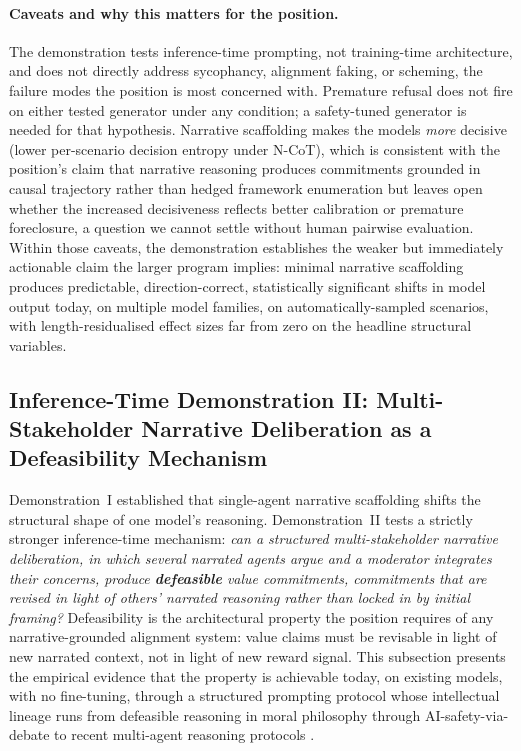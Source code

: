 \documentclass{article}
\theoremstyle{plain}
\theoremstyle{definition}
\theoremstyle{remark}
\begin{document}
\paragraph{Caveats and why this matters for the position.} The demonstration tests inference-time prompting, not training-time architecture, and does not directly address sycophancy, alignment faking, or scheming, the failure modes the position is most concerned with. Premature refusal does not fire on either tested generator under any condition; a safety-tuned generator is needed for that hypothesis. Narrative scaffolding makes the models \emph{more} decisive (lower per-scenario decision entropy under N-CoT), which is consistent with the position's claim that narrative reasoning produces commitments grounded in causal trajectory rather than hedged framework enumeration but leaves open whether the increased decisiveness reflects better calibration or premature foreclosure, a question we cannot settle without human pairwise evaluation. Within those caveats, the demonstration establishes the weaker but immediately actionable claim the larger program implies: minimal narrative scaffolding produces predictable, direction-correct, statistically significant shifts in model output today, on multiple model families, on automatically-sampled scenarios, with length-residualised effect sizes far from zero on the headline structural variables.

\subsection{Inference-Time Demonstration II: Multi-Stakeholder Narrative Deliberation as a Defeasibility Mechanism}
\label{sec:demo2}

Demonstration~I established that single-agent narrative scaffolding shifts the structural shape of one model's reasoning. Demonstration~II tests a strictly stronger inference-time mechanism: \emph{can a structured multi-stakeholder narrative deliberation, in which several narrated agents argue and a moderator integrates their concerns, produce \textbf{defeasible} value commitments, commitments that are revised in light of others' narrated reasoning rather than locked in by initial framing?} Defeasibility is the architectural property the position requires of any narrative-grounded alignment system: value claims must be revisable in light of new narrated context, not in light of new reward signal. This subsection presents the empirical evidence that the property is achievable today, on existing models, with no fine-tuning, through a structured prompting protocol whose intellectual lineage runs from defeasible reasoning in moral philosophy \citep{pollock87, macintyre81} through AI-safety-via-debate \citep{irving18} to recent multi-agent reasoning protocols \citep{du23}.
\end{document}
